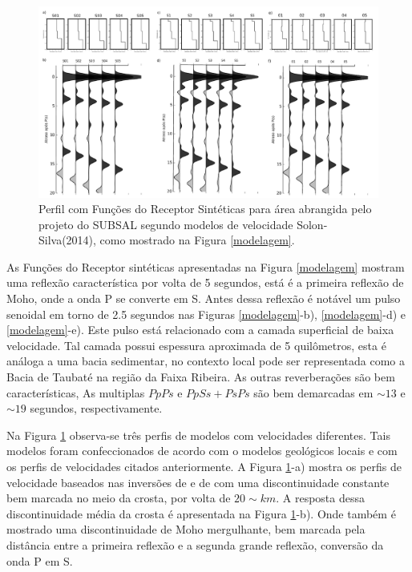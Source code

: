 \begin{figure}[!ht]
\centering
\includegraphics[scale=0.25]{Figs/perfil_RF_sintetico.png}
\caption{Perfil com Funções do Receptor Sintéticas para área abrangida pelo projeto do SUBSAL segundo modelos de velocidade Solon-Silva(2014), como mostrado na Figura \ref{modelagem}.}
\label{perfil_modelagem}
\end{figure}

As Funções do Receptor sintéticas apresentadas na Figura \ref{modelagem} mostram uma reflexão característica por volta de 5 segundos, está é a primeira reflexão de Moho, onde a onda P se converte em S. Antes dessa reflexão é notável um pulso senoidal em torno de 2.5 segundos nas Figuras \ref{modelagem}-b), \ref{modelagem}-d) e \ref{modelagem}-e). Este pulso está relacionado com a camada superficial de baixa velocidade. Tal camada possui espessura aproximada de 5 quilômetros, esta é análoga a uma bacia sedimentar, no contexto local pode ser representada como a Bacia de Taubaté na região da Faixa Ribeira. As outras reverberações são bem características, As multiplas $PpPs$ e $PpSs+PsPs$ são bem demarcadas em $\sim 13$ e $\sim 19$ segundos, respectivamente.

Na Figura \ref{perfil_modelagem} observa-se três perfis de modelos com velocidades diferentes. Tais modelos foram confeccionados de acordo com o modelos geológicos locais e com os perfis de velocidades citados anteriormente. A Figura \ref{perfil_modelagem}-a) mostra os perfis de velocidade baseados nas inversões de \cite{flora_solon_ancient_2013} e de \cite{Silva_2014} com uma discontinuidade constante bem marcada no meio da crosta, por volta de $20 \sim km$. A resposta dessa discontinuidade média da crosta é apresentada na Figura \ref{perfil_modelagem}-b). Onde também é mostrado uma discontinuidade de Moho mergulhante, bem marcada pela distância entre a primeira reflexão e a segunda grande reflexão, conversão da onda P em S.

